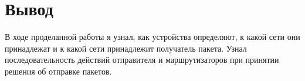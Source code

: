 \chapter{Вывод}
\label{ch:chap3}

В ходе проделанной работы я узнал, как устройства определяют, к какой сети они принадлежат и к какой сети принадлежит получатель пакета.
Узнал последовательность действий отправителя и маршрутизаторов при принятии решения об отправке пакетов.

\endinput